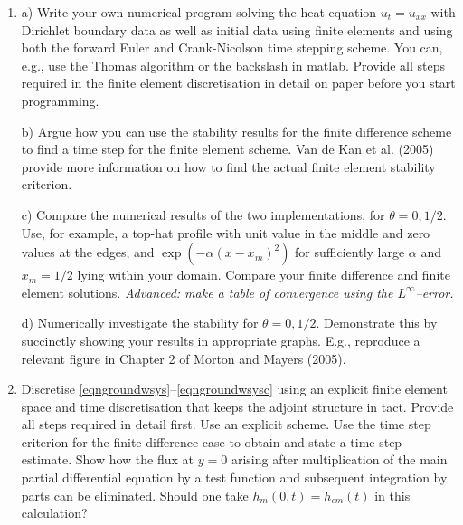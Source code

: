 \documentclass [12pt,english]{article}
\begin{document}
\begin{enumerate}

\item a) Write your own numerical program solving the heat equation $u_t=u_{xx}$ with Dirichlet boundary data as well as initial data using
finite elements and using both the forward Euler and Crank-Nicolson time stepping scheme.
You can, e.g., use the Thomas algorithm or the backslash in matlab.
Provide all steps required in the finite element discretisation in detail on paper before you start programming.

b) Argue how you can use the stability results for the finite difference scheme to find a time step for the finite element scheme.
Van de Kan et al. (2005) provide more information on how to find the actual finite element stability criterion.

c) Compare the numerical results of the two implementations, for $\theta=0,1/2$.
Use, for example, a top-hat profile with unit value in the middle and zero values at the edges, and
$\exp(-\alpha(x-x_m)^2)$ for sufficiently large $\alpha$ and $x_m=1/2$ lying within your domain.
Compare your finite difference and finite element solutions.
{\em Advanced: make a table of convergence using the $L^{\infty}$--error.}

d) Numerically investigate the stability for $\theta=0,1/2$.
Demonstrate this by succinctly showing your results in appropriate graphs.
E.g., reproduce a relevant figure in Chapter 2 of Morton and Mayers (2005).

\item Discretise  \eqref{eqngroundwsys}--\eqref{eqngroundwsysc} using an explicit finite element space and time discretisation
that keeps the adjoint structure in tact.
Provide all steps required in detail first. Use an explicit scheme.
Use the time step criterion for the finite difference case to obtain and state a time step estimate.
Show how the flux at $y=0$ arising after multiplication of the main partial differential equation by a test function and
subsequent integration by parts can be eliminated. Should one take $h_m(0,t)=h_{cm}(t)$ in this calculation?


\end{enumerate}
\end{document}
